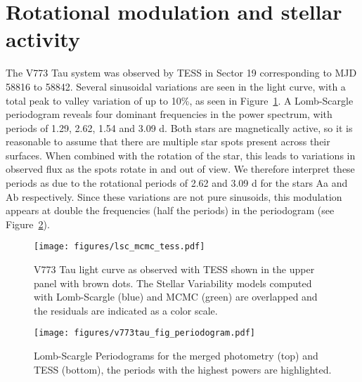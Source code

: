 \documentclass{aa}
\begin{document}
\section{Rotational modulation and stellar activity} \label{sec:variability}



The V773 Tau system was observed by TESS in Sector 19 corresponding to MJD 58816 to 58842.
%
Several sinusoidal variations are seen in the light curve, with a total peak to valley variation of up to 10\%, as seen in Figure~\ref{fig:tess_variability}.
%
A Lomb-Scargle periodogram reveals four dominant frequencies in the power spectrum, with periods of 1.29, 2.62, 1.54 and 3.09 d.
%
Both stars are magnetically active, so it is reasonable to assume that there are multiple star spots present across their surfaces.
%
When combined with the rotation of the star, this leads to variations in observed flux as the spots rotate in and out of view.
%
We therefore interpret these periods as due to the rotational periods of 2.62 and 3.09 d for the stars Aa and Ab respectively. 
%
Since these variations are not pure sinusoids, this modulation appears at double the frequencies (half the periods) in the periodogram (see Figure~\ref{fig:two_periodograms}).

\begin{figure}
\begin{center}
    \centering
    \texttt{[image: figures/lsc\_mcmc\_tess.pdf]}
    \caption{V773 Tau light curve as observed with TESS shown in the upper panel with brown dots.
    The Stellar Variability models computed with Lomb-Scargle (blue) and MCMC (green) are overlapped and the residuals are indicated as a color scale.}
\label{fig:tess_variability}
\end{center}
\end{figure}

\begin{figure}[ht]
    \centering
    \texttt{[image: figures/v773tau\_fig\_periodogram.pdf]}
    \caption{Lomb-Scargle Periodograms for the merged photometry (top) and TESS (bottom), the periods with the highest powers are highlighted.}
    \label{fig:two_periodograms}
\end{figure}
\end{document}
